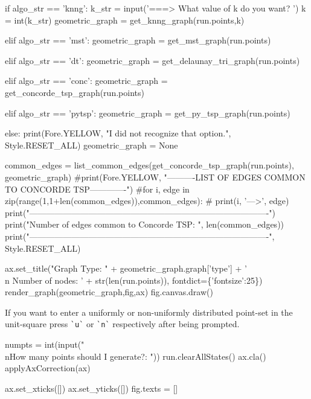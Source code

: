 if algo_str == 'knng':
      k_str = input('===> What value of k do you want? ')
      k     = int(k_str)
      geometric_graph = get_knng_graph(run.points,k)

elif algo_str == 'mst':
     geometric_graph = get_mst_graph(run.points)

elif algo_str == 'dt':
      geometric_graph = get_delaunay_tri_graph(run.points)

elif algo_str == 'conc':
     geometric_graph = get_concorde_tsp_graph(run.points)

elif algo_str == 'pytsp':
     geometric_graph = get_py_tsp_graph(run.points)

else:
      print(Fore.YELLOW, "I did not recognize that option.", Style.RESET_ALL)
      geometric_graph = None


common_edges = list_common_edges(get_concorde_tsp_graph(run.points), geometric_graph)
#print(Fore.YELLOW, "----------LIST OF EDGES COMMON TO CONCORDE TSP-------------")
#for i, edge in zip(range(1,1+len(common_edges)),common_edges):
#     print(i, '--->', edge)
print("-------------------------------------------------------------------------------------")
print("Number of edges common to Concorde TSP: ", len(common_edges))
print("-------------------------------------------------------------------------------------", Style.RESET_ALL)



ax.set_title("Graph Type: " + geometric_graph.graph['type'] + '\\n Number of nodes: ' + str(len(run.points)), fontdict=\{'fontsize':25\})
render_graph(geometric_graph,fig,ax)
fig.canvas.draw()
\nwendcode{}\nwdocspar

If you want to enter a uniformly or non-uniformly distributed point-set in the unit-square press \verb|`u`| or \verb|`n`|
respectively after being prompted. 

\nwenddocs{}\endmoddef\nwstartdeflinemarkup{}\nwenddeflinemarkup
numpts = int(input("\\nHow many points should I generate?: ")) 
run.clearAllStates()
ax.cla()
applyAxCorrection(ax)

ax.set_xticks([])
ax.set_yticks([])
fig.texts = []
                 
